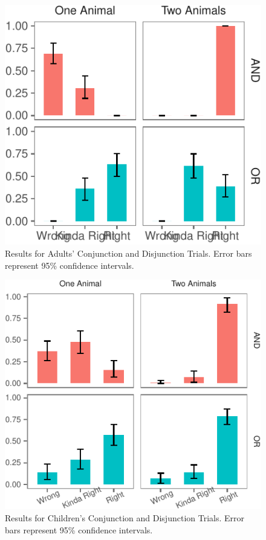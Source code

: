 \documentclass[10pt, letterpaper]{article}
\newenvironment{CodeChunk}{}{}
\begin{document}
\begin{CodeChunk}
\begin{figure}[t]

{\centering \includegraphics{figs/plot-1} 

}

\caption[Results for Adults' Conjunction and Disjunction Trials]{Results for Adults' Conjunction and Disjunction Trials. Error bars represent 95\% confidence intervals.}\label{fig:plot}
\end{figure}
\end{CodeChunk}

\begin{CodeChunk}
\begin{figure}[t]

{\centering \includegraphics{figs/child_data-1} 

}

\caption[Results for Children's Conjunction and Disjunction Trials]{Results for Children's Conjunction and Disjunction Trials. Error bars represent 95\% confidence intervals.}\label{fig:child_data}
\end{figure}
\end{CodeChunk}
\end{document}
